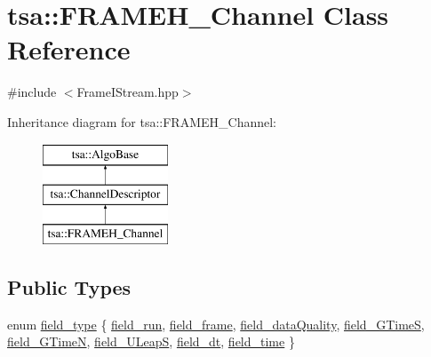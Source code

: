 \hypertarget{classtsa_1_1_f_r_a_m_e_h___channel}{}\section{tsa\+:\+:F\+R\+A\+M\+E\+H\+\_\+\+Channel Class Reference}
\label{classtsa_1_1_f_r_a_m_e_h___channel}


{\ttfamily \#include $<$Frame\+I\+Stream.\+hpp$>$}

Inheritance diagram for tsa\+:\+:F\+R\+A\+M\+E\+H\+\_\+\+Channel\+:\begin{figure}[H]
\begin{center}
\leavevmode
\includegraphics[height=3.000000cm]{classtsa_1_1_f_r_a_m_e_h___channel}
\end{center}
\end{figure}
\subsection*{Public Types}
\begin{DoxyCompactItemize}
\item 
enum \hyperlink{classtsa_1_1_f_r_a_m_e_h___channel_af9bd3bfda5ebc40f65e8af27abac9fe3}{field\+\_\+type} \{ \newline
\hyperlink{classtsa_1_1_f_r_a_m_e_h___channel_af9bd3bfda5ebc40f65e8af27abac9fe3a11936056dc8f51d020db82b4cd4cd5b3}{field\+\_\+run}, 
\hyperlink{classtsa_1_1_f_r_a_m_e_h___channel_af9bd3bfda5ebc40f65e8af27abac9fe3a37f297e43f3378c404b42391c9ece6bf}{field\+\_\+frame}, 
\hyperlink{classtsa_1_1_f_r_a_m_e_h___channel_af9bd3bfda5ebc40f65e8af27abac9fe3ae1cd9acd47598e9f3473148b6fcc09d4}{field\+\_\+data\+Quality}, 
\hyperlink{classtsa_1_1_f_r_a_m_e_h___channel_af9bd3bfda5ebc40f65e8af27abac9fe3a93b921e1acc87fa78badf6e4bc4552d7}{field\+\_\+\+G\+TimeS}, 
\newline
\hyperlink{classtsa_1_1_f_r_a_m_e_h___channel_af9bd3bfda5ebc40f65e8af27abac9fe3ab14b559f3bf02d8c2dfbcd71b0a2f17b}{field\+\_\+\+G\+TimeN}, 
\hyperlink{classtsa_1_1_f_r_a_m_e_h___channel_af9bd3bfda5ebc40f65e8af27abac9fe3add897c0e122b716817814e73f0afef3b}{field\+\_\+\+U\+LeapS}, 
\hyperlink{classtsa_1_1_f_r_a_m_e_h___channel_af9bd3bfda5ebc40f65e8af27abac9fe3aa467146fdc3b2c4bd49bf0f301d3fad5}{field\+\_\+dt}, 
\hyperlink{classtsa_1_1_f_r_a_m_e_h___channel_af9bd3bfda5ebc40f65e8af27abac9fe3a7aa7e4e96809decee1afe9a7583b0ae8}{field\+\_\+time}
 \}
\end{DoxyCompactItemize}
